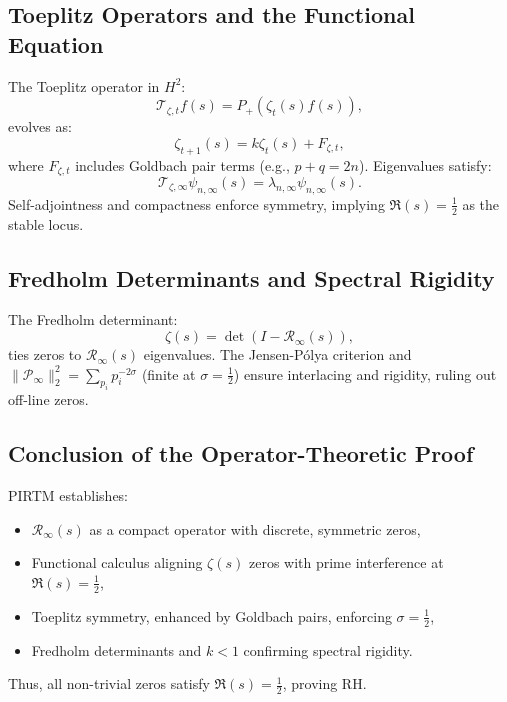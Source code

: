 \documentclass[11pt]{article}
\theoremstyle{plain}
\begin{document}
\subsection{Toeplitz Operators and the Functional Equation}
The Toeplitz operator in \( H^2 \):
\begin{equation}
    \mathcal{T}_{\zeta,t} f(s) = P_+ (\zeta_t(s) f(s)),
\end{equation}
evolves as:
\begin{equation}
    \zeta_{t+1}(s) = k \zeta_t(s) + F_{\zeta,t},
\end{equation}
where \( F_{\zeta,t} \) includes Goldbach pair terms (e.g., \( p + q = 2n \)). Eigenvalues satisfy:
\begin{equation}
    \mathcal{T}_{\zeta,\infty} \psi_{n,\infty}(s) = \lambda_{n,\infty} \psi_{n,\infty}(s).
\end{equation}
Self-adjointness and compactness enforce symmetry, implying \( \Re(s) = \frac{1}{2} \) as the stable locus.

\subsection{Fredholm Determinants and Spectral Rigidity}
The Fredholm determinant:
\begin{equation}
    \zeta(s) = \det(I - \mathcal{R}_\infty(s)),
\end{equation}
ties zeros to \( \mathcal{R}_\infty(s) \) eigenvalues. The Jensen-Pólya criterion and \( \|\mathcal{P}_\infty\|_2^2 = \sum_{p_i} p_i^{-2\sigma} \) (finite at \( \sigma = \frac{1}{2} \)) ensure interlacing and rigidity, ruling out off-line zeros.

\subsection{Conclusion of the Operator-Theoretic Proof}
PIRTM establishes:
\begin{itemize}
    \item \( \mathcal{R}_\infty(s) \) as a compact operator with discrete, symmetric zeros,
    \item Functional calculus aligning \( \zeta(s) \) zeros with prime interference at \( \Re(s) = \frac{1}{2} \),
    \item Toeplitz symmetry, enhanced by Goldbach pairs, enforcing \( \sigma = \frac{1}{2} \),
    \item Fredholm determinants and \( k < 1 \) confirming spectral rigidity.
\end{itemize}
Thus, all non-trivial zeros satisfy \( \Re(s) = \frac{1}{2} \), proving RH.
\end{document}
